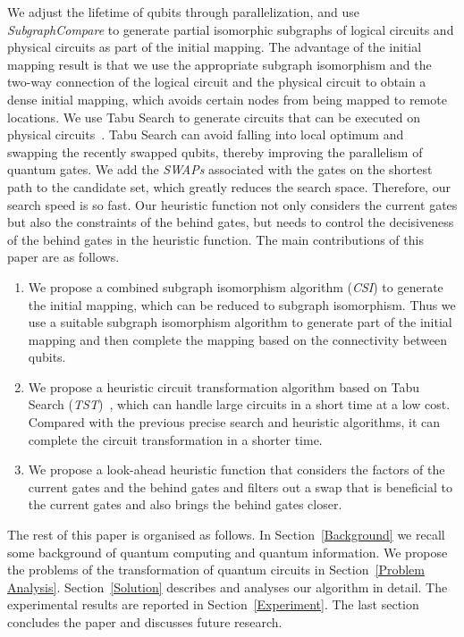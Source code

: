 \documentclass[runningheads]{llncs}
\begin{document}
We adjust the lifetime of qubits through parallelization, and use \textit{SubgraphCompare} to generate partial isomorphic subgraphs of logical circuits and physical circuits as part of the initial mapping. The advantage of the initial mapping result is that we use the appropriate subgraph isomorphism and the two-way connection of the logical circuit and the physical circuit to obtain a dense initial mapping, which avoids certain nodes from being mapped to remote locations. We use Tabu Search to generate circuits that can be executed on physical circuits~\cite{Glover1990}. Tabu Search can avoid falling into local optimum and swapping the recently swapped qubits, thereby improving the parallelism of quantum gates. We add the \textit{SWAPs} associated with the gates on the shortest path to the candidate set, which greatly reduces the search space. Therefore, our search speed is so fast. Our heuristic function not only considers the current gates but also the constraints of the behind gates, but needs to control the decisiveness of the behind gates in the heuristic function.
The main contributions of this paper are as follows.
	\begin{enumerate}
		\item We propose a combined subgraph isomorphism algorithm (\textit{CSI}) to generate the initial mapping, which can be reduced to subgraph isomorphism. Thus we use a suitable subgraph isomorphism algorithm to generate part of the initial mapping and then complete the mapping based on the connectivity between qubits.
		\item We propose a heuristic circuit transformation algorithm based on Tabu Search (\textit{TST})~\cite{Glover1990}, which can handle large circuits in a short time at a low cost. Compared with the previous precise search and heuristic algorithms, it can complete the circuit transformation in a shorter time. 
		\item  We propose a look-ahead heuristic function that considers the factors of the current gates and the behind gates and filters out a swap that is beneficial to the current gates and also brings the behind gates closer.
	\end{enumerate}

The rest of this paper is organised as follows.
In Section~\ref{Background} we recall some background of quantum computing and quantum information.
We propose the problems of the transformation of quantum circuits in Section~\ref{Problem Analysis}.
Section~\ref{Solution} describes and analyses our algorithm in detail.
The experimental results are reported in Section~\ref{Experiment}. 
The last section concludes the paper and discusses future research.
\end{document}
